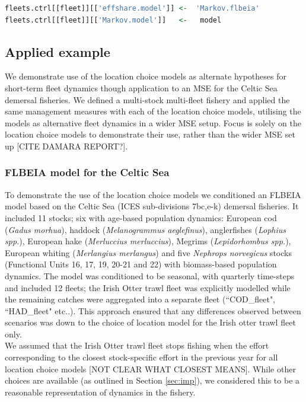 \documentclass[12pt, halfline, a4paper]{ouparticle}
\begin{document}
\begin{lstlisting}[language=R]
fleets.ctrl[[fleet]][['effshare.model']] <-  'Markov.flbeia'
fleets.ctrl[[fleet]][['Markov.model']]   <-   model 
\end{lstlisting}

\subsection{Applied example}

We demonstrate use of the location choice models as alternate hypotheses for
short-term fleet dynamics though application to an MSE for the Celtic Sea
demersal fisheries. We defined a multi-stock multi-fleet fishery and applied
the same management measures with each of the location choice models, utilising
the models as alternative fleet dynamics in a wider MSE setup. Focus is
solely on the location choice models to demonstrate their use, rather than the
wider MSE set up [CITE DAMARA REPORT?].

\subsubsection{FLBEIA model for the Celtic Sea}

To demonstrate the use of the location choice models we conditioned an FLBEIA
model based on the Celtic Sea (ICES sub-divisions 7bc,e-k) demersal fisheries.
It included 11 stocks; six with age-based population dynamics: European cod
(\textit{Gadus morhua}), haddock (\textit{Melanogrammus aeglefinus}),
anglerfishes (\textit{Lophius spp.}), European hake (\textit{Merluccius
	merluccius}), Megrims (\textit{Lepidorhombus spp.}), European whiting
(\textit{Merlangius merlangus}) and five \textit{Nephrops norvegicus} stocks
(Functional Units 16, 17, 19, 20-21 and 22) with biomass-based population
dynamics. The model was conditioned to be seasonal, with quarterly time-steps
and included 12 fleets; the Irish Otter trawl fleet was explicitly modelled
while the remaining catches were aggregated into a separate fleet
(``COD\_fleet", ``HAD\_fleet" etc..). This approach ensured that any
differences observed between scenarios was down to the choice of location model
for the Irish otter trawl fleet only. \\

We assumed that the Irish Otter trawl fleet stops fishing when the effort
corresponding to the closest stock-specific effort in the previous year for all
location choice models [NOT CLEAR WHAT CLOSEST MEANS]. While other choices are available (as outlined in
Section \ref{sec:imp}), we considered this to be a reasonable representation of
dynamics in the fishery. 
\end{document}
